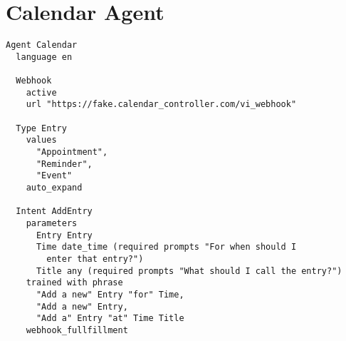 \section{Calendar Agent}

\begin{lstlisting}
Agent Calendar
  language en

  Webhook
    active
    url "https://fake.calendar_controller.com/vi_webhook"
  
  Type Entry
    values 
      "Appointment", 
      "Reminder", 
      "Event"
    auto_expand
  
  Intent AddEntry
    parameters 
      Entry Entry
      Time date_time (required prompts "For when should I
        enter that entry?")
      Title any (required prompts "What should I call the entry?")
    trained with phrase
      "Add a new" Entry "for" Time,
      "Add a new" Entry,
      "Add a" Entry "at" Time Title
    webhook_fullfillment
\end{lstlisting}